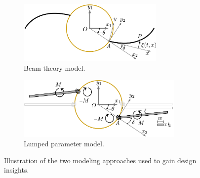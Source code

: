 \begin{figure}[t]
\centering

\begin{subfigure}[b]{0.495\columnwidth}
\centering 
\includegraphics[height=1.2in]{../ch7/figures/coordinate-2}
\caption{Beam theory model.}\label{fig:ch7:coordinate}
\end{subfigure}%
\begin{subfigure}[b]{0.495\columnwidth}
\centering 
\includegraphics[height=1.2in]{../ch7/figures/prbdm-2}
\caption{Lumped parameter model.}\label{fig:ch7:prbdm}
\end{subfigure}%

\caption{Illustration of the two modeling approaches used to gain design insights. \label{fig:ch7:models}}
\end{figure} 